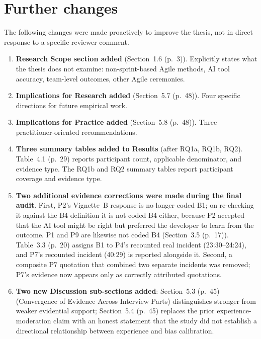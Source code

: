 \documentclass[12pt,a4paper,twoside]{article}
\begin{document}
\section{Further changes}

The following changes were made proactively to improve the thesis, not in direct
response to a specific reviewer comment.

\begin{enumerate}

  \item \textbf{Research Scope section added} (Section~1.6 (p.~3)). Explicitly states what
        the thesis does not examine: non-sprint-based Agile methods, AI tool accuracy,
        team-level outcomes, other Agile ceremonies.

  \item \textbf{Implications for Research added} (Section~5.7 (p.~48)). Four specific
        directions for future empirical work.

  \item \textbf{Implications for Practice added} (Section~5.8 (p.~48)). Three
        practitioner-oriented recommendations.

  \item \textbf{Three summary tables added to Results} (after RQ1a, RQ1b, RQ2).
        Table~4.1 (p.~29) reports participant count, applicable denominator, and evidence type.
        The RQ1b and RQ2 summary tables report participant coverage and evidence type.

  \item \textbf{Two additional evidence corrections were made during the final audit}.
        First, P2's Vignette~B response is no longer coded B1; on re-checking it against
        the B4 definition it is not coded B4 either, because P2 accepted that the AI tool
        might be right but preferred the developer to learn from the outcome. P1 and P9
        are likewise not coded B4 (Section~3.5 (p.~17)). Table~3.3 (p.~20) assigns B1 to P4's recounted real incident
        (23:30--24:24), and P7's recounted incident (40:29) is reported alongside it.
        Second, a composite P7 quotation that combined two separate incidents was
        removed; P7's evidence now appears only as correctly attributed quotations.

  \item \textbf{Two new Discussion sub-sections added}: Section~5.3 (p.~45) (Convergence of
        Evidence Across Interview Parts) distinguishes stronger from weaker evidential
        support; Section~5.4 (p.~45) replaces the prior experience-moderation claim with an
        honest statement that the study did not establish a directional relationship
        between experience and bias calibration.


\end{enumerate}
\end{document}
